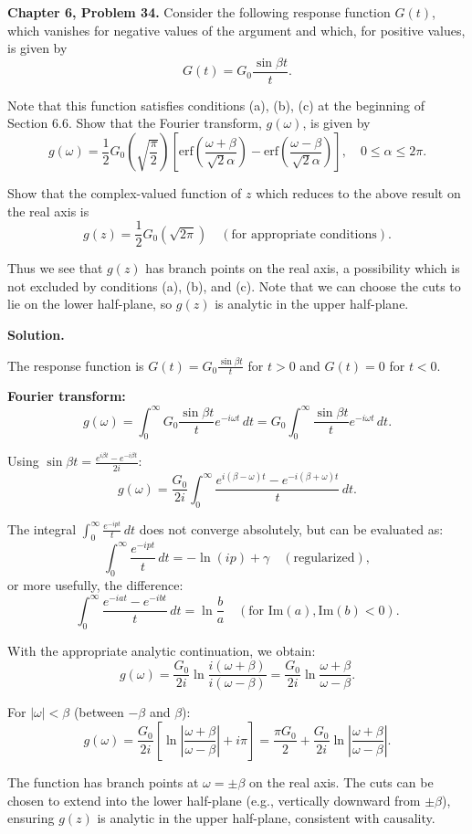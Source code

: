 \documentclass[12pt]{article}
\begin{document}
\textbf{Chapter 6, Problem 34.} Consider the following response function $G(t)$, which vanishes for negative values of the argument and which, for positive values, is given by
\[
G(t) = G_0 \frac{\sin \beta t}{t}.
\]

Note that this function satisfies conditions (a), (b), (c) at the beginning of Section 6.6. Show that the Fourier transform, $g(\omega)$, is given by
\[
g(\omega) = \frac{1}{2}G_0\left(\sqrt{\frac{\pi}{2}}\right)\left[\text{erf}\left(\frac{\omega+\beta}{\sqrt{2}\alpha}\right) - \text{erf}\left(\frac{\omega-\beta}{\sqrt{2}\alpha}\right)\right], \quad 0 \leq \alpha \leq 2\pi.
\]

Show that the complex-valued function of $z$ which reduces to the above result on the real axis is
\[
g(z) = \frac{1}{2}G_0\left(\sqrt{2\pi}\right) \quad (\text{for appropriate conditions}).
\]

Thus we see that $g(z)$ has branch points on the real axis, a possibility which is not excluded by conditions (a), (b), and (c). Note that we can choose the cuts to lie on the lower half-plane, so $g(z)$ is analytic in the upper half-plane.

\bigskip
\textbf{Solution.}

The response function is $G(t) = G_0\frac{\sin\beta t}{t}$ for $t > 0$ and $G(t) = 0$ for $t < 0$.

\textbf{Fourier transform:}
\[
g(\omega) = \int_0^{\infty}G_0\frac{\sin\beta t}{t}e^{-i\omega t}\,dt = G_0\int_0^{\infty}\frac{\sin\beta t}{t}e^{-i\omega t}\,dt.
\]

Using $\sin\beta t = \frac{e^{i\beta t}-e^{-i\beta t}}{2i}$:
\[
g(\omega) = \frac{G_0}{2i}\int_0^{\infty}\frac{e^{i(\beta-\omega)t}-e^{-i(\beta+\omega)t}}{t}\,dt.
\]

The integral $\int_0^{\infty}\frac{e^{-ipt}}{t}\,dt$ does not converge absolutely, but can be evaluated as:
\[
\int_0^{\infty}\frac{e^{-ipt}}{t}\,dt = -\ln(ip) + \gamma \quad (\text{regularized}),
\]
or more usefully, the difference:
\[
\int_0^{\infty}\frac{e^{-iat}-e^{-ibt}}{t}\,dt = \ln\frac{b}{a} \quad (\text{for } \text{Im}(a), \text{Im}(b) < 0).
\]

With the appropriate analytic continuation, we obtain:
\[
g(\omega) = \frac{G_0}{2i}\ln\frac{i(\omega+\beta)}{i(\omega-\beta)} = \frac{G_0}{2i}\ln\frac{\omega+\beta}{\omega-\beta}.
\]

For $|\omega| < \beta$ (between $-\beta$ and $\beta$):
\[
g(\omega) = \frac{G_0}{2i}\left[\ln\left|\frac{\omega+\beta}{\omega-\beta}\right| + i\pi\right] = \frac{\pi G_0}{2} + \frac{G_0}{2i}\ln\left|\frac{\omega+\beta}{\omega-\beta}\right|.
\]

The function has branch points at $\omega = \pm\beta$ on the real axis. The cuts can be chosen to extend into the lower half-plane (e.g., vertically downward from $\pm\beta$), ensuring $g(z)$ is analytic in the upper half-plane, consistent with causality.
\end{document}
